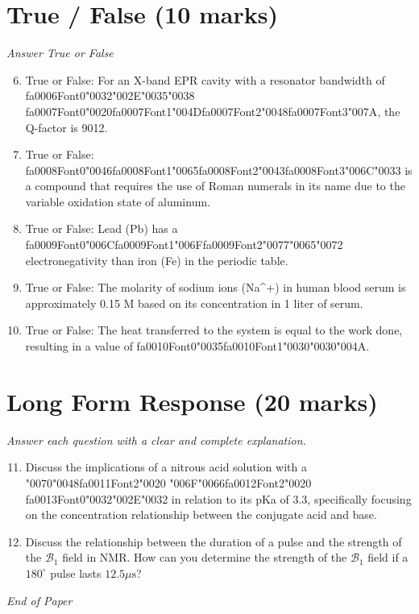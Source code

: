 \documentclass[12pt]{article}
\begin{document}
\section*{True / False (10 marks)}
\textit{Answer True or False}
\begin{enumerate}[label=\arabic*.]
\setcounter{enumi}{5}
\item True or False: For an X-band EPR cavity with a resonator bandwidth of {\csname fa0006Font0\endcsname\char"0032}{\char"002E}{\char"0035}{\char"0038} {\csname fa0007Font0\endcsname\char"0020}{\csname fa0007Font1\endcsname\char"004D}{\csname fa0007Font2\endcsname\char"0048}{\csname fa0007Font3\endcsname\char"007A}, the Q-factor is 9012.
\item True or False: {\csname fa0008Font0\endcsname\char"0046}{\csname fa0008Font1\endcsname\char"0065}{\csname fa0008Font2\endcsname\char"0043}{\csname fa0008Font3\endcsname\char"006C}{\char"0033} is a compound that requires the use of Roman numerals in its name due to the variable oxidation state of aluminum.
\item True or False: Lead (Pb) has a {\csname fa0009Font0\endcsname\char"006C}{\csname fa0009Font1\endcsname\char"006F}{\csname fa0009Font2\endcsname\char"0077}{\char"0065}{\char"0072} electronegativity than iron (Fe) in the periodic table.
\item True or False: The molarity of sodium ions (Na\^{}+) in human blood serum is approximately 0.15 M based on its concentration in 1 liter of serum.
\item True or False: The heat transferred to the system is equal to the work done, resulting in a value of {\csname fa0010Font0\endcsname\char"0035}{\csname fa0010Font1\endcsname\char"0030}{\char"0030}{\char"004A}.
\end{enumerate}

\section*{Long Form Response (20 marks)}
\textit{Answer each question with a clear and complete explanation.}
\begin{enumerate}[label=\arabic*.]
\setcounter{enumi}{10}
\item Discuss the implications of a nitrous acid solution with a {\char"0070}{\char"0048}{\csname fa0011Font2\endcsname\char"0020} {\char"006F}{\char"0066}{\csname fa0012Font2\endcsname\char"0020} {\csname fa0013Font0\endcsname\char"0032}{\char"002E}{\char"0032} in relation to its
pKa of 3.3, specifically focusing on the concentration relationship between the conjugate
acid and base.
\item Discuss the relationship between the duration of a pulse and the strength of the
$\mathscr{B}_1$ field in NMR. How can you determine the strength of the $\mathscr{B}_1$
field if a $180^{\circ}$ pulse lasts $12.5 \mu \mathrm{s}$?
\end{enumerate}

\vfill
\noindent\textit{End of Paper}
\end{document}
